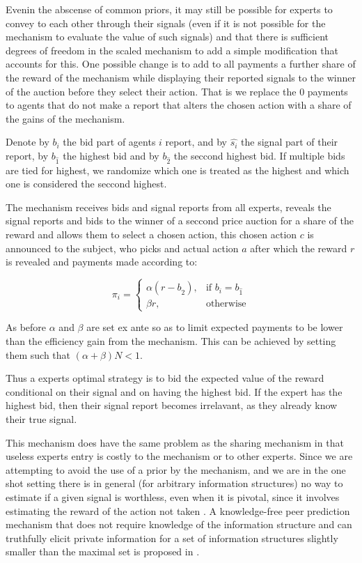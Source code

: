Evenin the abscense of common priors, it may still be possible for experts to convey to each other through their signals (even if it is not possible for the mechanism to evaluate the value of such signals) and that there is sufficient degrees of freedom in the scaled mechanism to add a simple modification that accounts for this.
One possible change is to add to all payments a further share of the reward of the mechanism while displaying their reported signals to the winner of the auction before they select their action. That is we replace the 0 payments to agents that do not make a report that alters the chosen action with a  share of the gains of the mechanism.

Denote by $b_i$ the bid part of agents $i$ report, and by $\hat{s_i}$ the signal part of their report, by $b_{\hat{1}}$ the highest bid and by $b_{\hat{2}}$ the seccond highest bid. If multiple bids are tied for highest, we  randomize which one is treated as the highest and which one is considered the seccond highest.

\begin{mech}
The mechanism receives bids and signal reports from all experts, reveals the signal reports and bids to the winner of a seccond price auction for a share of the reward and allows them to select a chosen action, this chosen action $c$ is announced to the subject, who picks and actual action $a$ after which the reward $r$ is revealed and payments made according to:


\[
    \pi_i = 
\begin{cases}
    \alpha (r - b_{\hat{2}} ) ,& \text{if } b_i = b_{\hat{1}}\\
    \beta r,              & \text{otherwise}
\end{cases}
\]

\end{mech}

As before $\alpha$ and $\beta$ are set ex ante so as to limit expected payments to be lower than the efficiency gain from the mechanism. This can be achieved by setting them such that $(\alpha + \beta)N < 1$.


Thus a experts optimal strategy is to bid the expected value of the reward conditional on their signal and on having the highest bid.
If the expert has the highest bid, then their signal report becomes irrelavant, as they already know their true signal. %

This mechanism does have the same problem as the sharing mechanism in that useless experts entry is costly to the mechanism or to other experts.
Since we are attempting to avoid the use of a prior by the mechanism, and we are in the one shot setting there is in general (for arbitrary information structures) no way to estimate if a given signal is worthless, even when it is pivotal, since it involves estimating the reward of the action not taken \cite{della2012crowd,waggoner2014output, witkowski2014robust}.
A knowledge-free peer prediction mechanism that does not require knowledge of the information structure and
can truthfully elicit private information for a set of information structures slightly smaller than the maximal set is proposed in \cite{zhang2014elicitability}. 


